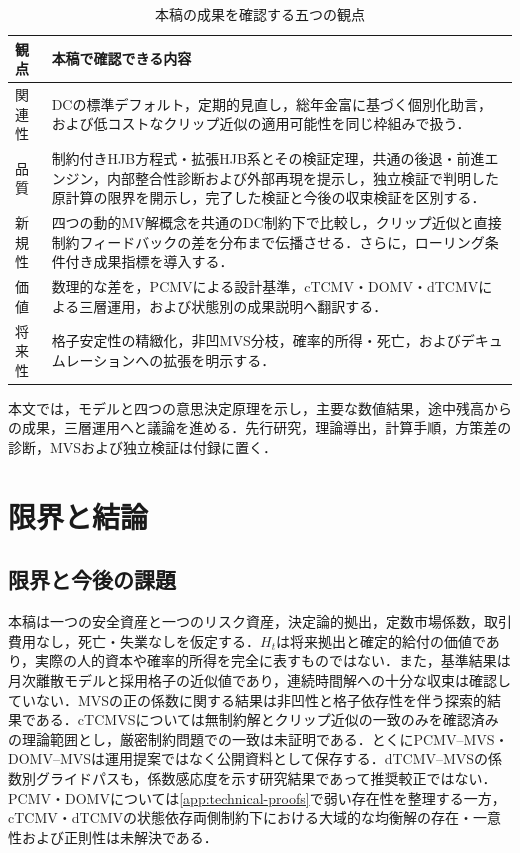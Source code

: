 \documentclass[10pt,a4paper]{article}
\theoremstyle{plain}
\theoremstyle{definition}
\begin{document}
\begin{table}[htbp]
\centering
\footnotesize
\caption{本稿の成果を確認する五つの観点}
\label{tab:ica-response-40}
\begin{tabularx}{\textwidth}{p{18mm}X}
\toprule
観点 & 本稿で確認できる内容 \\
\midrule
関連性
& DCの標準デフォルト，定期的見直し，総年金富に基づく個別化助言，および低コストなクリップ近似の適用可能性を同じ枠組みで扱う．\\
品質
& 制約付きHJB方程式・拡張HJB系とその検証定理，共通の後退・前進エンジン，内部整合性診断および外部再現を提示し，独立検証で判明した原計算の限界を開示し，完了した検証と今後の収束検証を区別する．\\
新規性
& 四つの動的MV解概念を共通のDC制約下で比較し，クリップ近似と直接制約フィードバックの差を分布まで伝播させる．さらに，ローリング条件付き成果指標を導入する．\\
価値
& 数理的な差を，PCMVによる設計基準，cTCMV・DOMV・dTCMVによる三層運用，および状態別の成果説明へ翻訳する．\\
将来性
& 格子安定性の精緻化，非凹MVS分枝，確率的所得・死亡，およびデキュムレーションへの拡張を明示する．\\
\bottomrule
\end{tabularx}
\end{table}

本文では，モデルと四つの意思決定原理を示し，主要な数値結果，途中残高からの成果，三層運用へと議論を進める．先行研究，理論導出，計算手順，方策差の診断，MVSおよび独立検証は付録に置く．

\section{限界と結論}
\label{sec:conclusion}

\subsection{限界と今後の課題}
本稿は一つの安全資産と一つのリスク資産，決定論的拠出，定数市場係数，取引費用なし，死亡・失業なしを仮定する．$H_t$は将来拠出と確定的給付の価値であり，実際の人的資本や確率的所得を完全に表すものではない．また，基準結果は月次離散モデルと採用格子の近似値であり，連続時間解への十分な収束は確認していない．MVSの正の係数に関する結果は非凹性と格子依存性を伴う探索的結果である．cTCMVSについては無制約解とクリップ近似の一致のみを確認済みの理論範囲とし，厳密制約問題での一致は未証明である．とくにPCMV--MVS・DOMV--MVSは運用提案ではなく公開資料として保存する．dTCMV--MVSの係数別グライドパスも，係数感応度を示す研究結果であって推奨較正ではない．PCMV・DOMVについては\ref{app:technical-proofs}で弱い存在性を整理する一方，cTCMV・dTCMVの状態依存両側制約下における大域的な均衡解の存在・一意性および正則性は未解決である．
\end{document}
